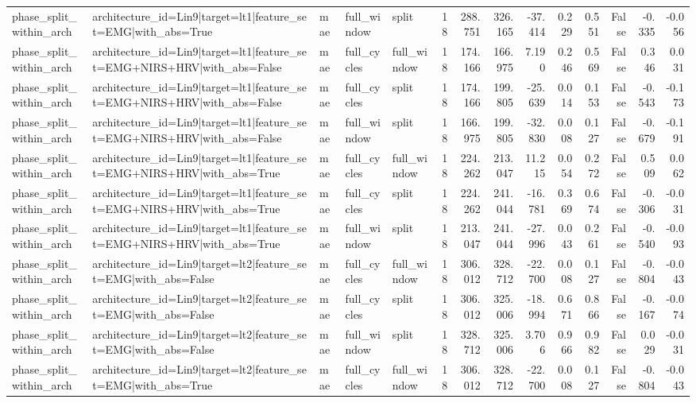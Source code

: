 \begin{table}
\begin{tabular}{lllllrrrrrrrrr}
phase_split_within_arch & architecture_id=Lin9|target=lt1|feature_set=EMG|with_abs=True & mae & full_window & split & 18 & 288.751 & 326.165 & -37.414 & 0.229 & 0.551 & False & -0.335 & -0.056 \\
phase_split_within_arch & architecture_id=Lin9|target=lt1|feature_set=EMG+NIRS+HRV|with_abs=False & mae & full_cycles & full_window & 18 & 174.166 & 166.975 & 7.190 & 0.246 & 0.569 & False & 0.346 & 0.031 \\
phase_split_within_arch & architecture_id=Lin9|target=lt1|feature_set=EMG+NIRS+HRV|with_abs=False & mae & full_cycles & split & 18 & 174.166 & 199.805 & -25.639 & 0.014 & 0.153 & False & -0.543 & -0.173 \\
phase_split_within_arch & architecture_id=Lin9|target=lt1|feature_set=EMG+NIRS+HRV|with_abs=False & mae & full_window & split & 18 & 166.975 & 199.805 & -32.830 & 0.008 & 0.127 & False & -0.679 & -0.191 \\
phase_split_within_arch & architecture_id=Lin9|target=lt1|feature_set=EMG+NIRS+HRV|with_abs=True & mae & full_cycles & full_window & 18 & 224.262 & 213.047 & 11.215 & 0.054 & 0.272 & False & 0.509 & 0.062 \\
phase_split_within_arch & architecture_id=Lin9|target=lt1|feature_set=EMG+NIRS+HRV|with_abs=True & mae & full_cycles & split & 18 & 224.262 & 241.044 & -16.781 & 0.369 & 0.674 & False & -0.306 & -0.031 \\
phase_split_within_arch & architecture_id=Lin9|target=lt1|feature_set=EMG+NIRS+HRV|with_abs=True & mae & full_window & split & 18 & 213.047 & 241.044 & -27.996 & 0.043 & 0.261 & False & -0.540 & -0.093 \\
phase_split_within_arch & architecture_id=Lin9|target=lt2|feature_set=EMG|with_abs=False & mae & full_cycles & full_window & 18 & 306.012 & 328.712 & -22.700 & 0.008 & 0.127 & False & -0.804 & -0.043 \\
phase_split_within_arch & architecture_id=Lin9|target=lt2|feature_set=EMG|with_abs=False & mae & full_cycles & split & 18 & 306.012 & 325.006 & -18.994 & 0.671 & 0.866 & False & -0.167 & -0.074 \\
phase_split_within_arch & architecture_id=Lin9|target=lt2|feature_set=EMG|with_abs=False & mae & full_window & split & 18 & 328.712 & 325.006 & 3.706 & 0.966 & 0.982 & False & 0.029 & -0.031 \\
phase_split_within_arch & architecture_id=Lin9|target=lt2|feature_set=EMG|with_abs=True & mae & full_cycles & full_window & 18 & 306.012 & 328.712 & -22.700 & 0.008 & 0.127 & False & -0.804 & -0.043 \\

\end{tabular}
\end{table}
